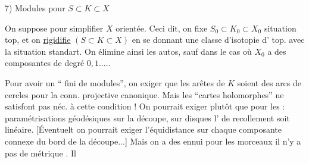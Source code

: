 
7) Modules pour $S\subset K\subset X$

On suppose  pour simplifier $X$   orientée. Ceci dit, on fixe $S_0\subset K_0\subset X_0$ situation top, et on \uline{rigidifie} $(S\subset K\subset X)$ en se donnant une classe d'isotopie d' top. avec la situation standart. On élimine ainsi les autos, sauf dans le cas  où $X_0$ a des composantes de degré $0,1$.....

Pour avoir un `` fini de modules'', on  exiger  que les arêtes de $K$ soient des arcs de cercles pour la conn. projective canonique. Mais les ``cartes  holomorphes'' ne satisfont pas néc. à cette condition ! On pourrait exiger plutôt que pour  les : paramétrisations géodésiques sur la découpe, sur disques  l' de recollement soit linéaire. [Éventuelt on pourrait exiger l'équidistance  sur chaque composante connexe du bord de la découpe...] Mais on a des ennui pour les morceaux   il n'y a pas de métrique . Il

